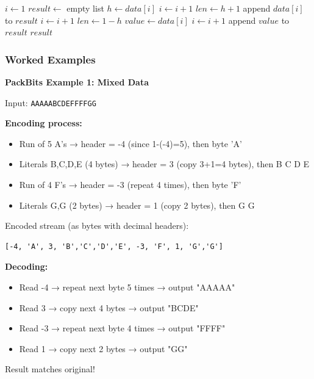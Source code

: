 \begin{algorithm}[H]
\caption{PackBits Decoding}
\begin{algorithmic}[1]
    \State $i \gets 1$
    \State $result \gets$ empty list
        \State $h \gets data[i]$ 
        \State $i \gets i + 1$
         
            \State $len \gets h + 1$
                \State append $data[i]$ to $result$
                \State $i \gets i + 1$
            \EndFor
         
            \State {}
        \Else {}
            \State $len \gets 1 - h$ 
            \State $value \gets data[i]$
            \State $i \gets i + 1$
                \State append $value$ to $result$
            \EndFor
        \EndIf
    \EndWhile
    \State \Return $result$
\EndProcedure
\end{algorithmic}
\end{algorithm}

\subsubsection{Worked Examples}

\begin{examplebox}
\textbf{PackBits Example 1: Mixed Data}

Input: \texttt{AAAAABCDEFFFFGG}

\textbf{Encoding process:}
\begin{itemize}
    \item Run of 5 A's → header = -4 (since 1-(-4)=5), then byte 'A'
    \item Literals B,C,D,E (4 bytes) → header = 3 (copy 3+1=4 bytes), then B C D E
    \item Run of 4 F's → header = -3 (repeat 4 times), then byte 'F'
    \item Literals G,G (2 bytes) → header = 1 (copy 2 bytes), then G G
\end{itemize}

Encoded stream (as bytes with decimal headers):
\begin{verbatim}
[-4, 'A', 3, 'B','C','D','E', -3, 'F', 1, 'G','G']
\end{verbatim}

\textbf{Decoding:}
\begin{itemize}
    \item Read -4 → repeat next byte 5 times → output "AAAAA"
    \item Read 3 → copy next 4 bytes → output "BCDE"
    \item Read -3 → repeat next byte 4 times → output "FFFF"
    \item Read 1 → copy next 2 bytes → output "GG"
\end{itemize}

Result matches original!
\end{examplebox}

